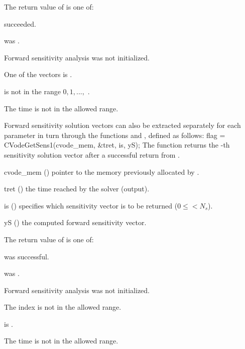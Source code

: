 {
  The return value  of  is one of:
  \begin{args}
  \item[\Id{CV\_SUCCESS}] 
     succeeded.
  \item[\Id{CV\_MEM\_NULL}] 
     was .
  \item[\Id{CV\_NO\_SENS}] 
    Forward sensitivity analysis was not initialized.
  \item[\Id{CV\_BAD\_DKY}] 
    One of the vectors  is .
  \item[\Id{CV\_BAD\_K}]
     is not in the range $0, 1, ...,$ .
  \item[\Id{CV\_BAD\_T}] 
    The time  is not in the allowed range.
  \end{args}
}
{}
Forward sensitivity solution vectors can also be extracted separately for 
each parameter in turn through the functions  and
, defined as follows:
{
  flag = CVodeGetSens1(cvode\_mem, \&tret, is, yS);
}
{
  The function  returns the -th sensitivity solution vector
  after a successful return from .
}
{
  \begin{args}
  \item[cvode\_mem] ()
    pointer to the memory previously allocated by .
  \item[tret] ()
    the time reached by the solver (output).
  \item[is] () specifies which sensitivity vector is to be returned
    ($0\le$$< N_s$).
  \item[yS] ()
    the computed forward sensitivity vector.
  \end{args}
}
{
  The return value  of  is one of:
  \begin{args}
  \item[\Id{CV\_SUCCESS}]
     was successful.
  \item[\Id{CV\_MEM\_NULL}] 
     was .
  \item[\Id{CV\_NO\_SENS}] 
    Forward sensitivity analysis was not initialized.
  \item[\Id{CV\_BAD\_IS}]
    The index  is not in the allowed range.
  \item[\Id{CV\_BAD\_DKY}] 
     is .
  \item[\Id{CV\_BAD\_T}] 
    The time  is not in the allowed range.
  \end{args}
}
